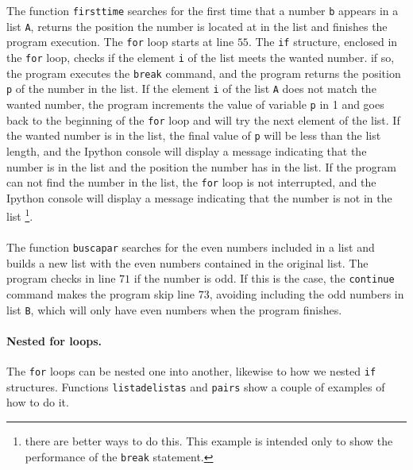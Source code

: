 \begin{paracol}{2}
The function \texttt{firsttime} searches for the first time that a number \texttt{b} appears in a list \texttt{A}, returns the position the number is located at in the list and finishes the program execution. The \texttt{for} loop starts at line $55$. The \texttt{if} structure, enclosed in the \texttt{for} loop, checks if the element \texttt{i} of the list meets the wanted number. if so, the program executes the \texttt{break} command, and the program returns the position \texttt{p} of the number in the list.  If the element \texttt{i} of the list \texttt{A} does not match the wanted number, the program increments the value of variable \texttt{p} in 1 and goes back to the beginning of the \texttt{for} loop and will try the next element of the list. If the wanted number is in the list,  the final value of \texttt{p} will be less than the list length, and the Ipython console will display a message indicating that the number is in the list and the position the number has in the list. If the program can not find the number in the list, the \texttt{for} loop is not interrupted, and the Ipython console will display a message indicating that the number is not in the list \footnote{there are better ways to do this. This example is intended only to show the performance of the \texttt{break} statement.}.
\ \\
\ \\

The function \texttt{buscapar} searches for the even numbers included in a list and builds a new list with the even numbers contained in the original list. The program checks in line $71$ if the number is odd. If this is the case, the \texttt{continue} command makes the program skip line $73$, avoiding including the odd numbers in list \texttt{B}, which will only have even numbers when the program finishes.

\paragraph{Nested for loops.}  The \texttt{for} loops can be nested one into another, likewise to how we nested \texttt{if} structures. Functions \texttt{listadelistas} and \texttt{pairs} show a couple of examples of how to do it.


\end{paracol}
